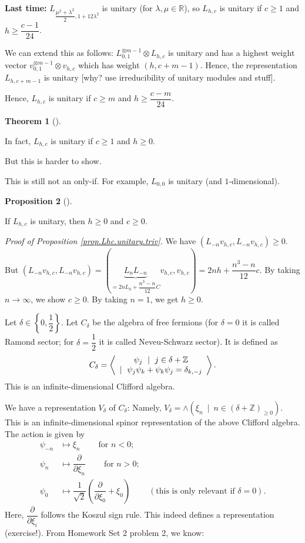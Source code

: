 \documentclass
[numbers=enddot,12pt,final,onecolumn,german,notitlepage]{scrartcl}%
\theoremstyle{definition}
\newtheorem{theo}{Theorem}
\newenvironment{theorem}[1][]
{\begin{theo}[#1]\begin{leftbar}}
{\end{leftbar}\end{theo}}
\newtheorem{prop}[theo]{Proposition}
\newenvironment{proposition}[1][]
{\begin{prop}[#1]\begin{leftbar}}
{\end{leftbar}\end{prop}}
\begin{document}
\textbf{Last time:} $L_{\dfrac{\mu^{2}+\lambda^{2}}{2},1+12\lambda^{2}}$ is
unitary (for $\lambda,\mu\in\mathbb{R}$), so $L_{h,c}$ is unitary if $c\geq1$
and $h\geq\dfrac{c-1}{24}$.

We can extend this as follows: $L_{0,1}^{\otimes m-1}\otimes L_{h,c}$ is
unitary and has a highest weight vector $v_{0,1}^{\otimes m-1}\otimes v_{h,c}$
which has weight $\left(  h,c+m-1\right)  $. Hence, the representation
$L_{h,c+m-1}$ is unitary [why? use irreducibility of unitary modules and stuff].

Hence, $L_{h,c}$ is unitary if $c\geq m$ and $h\geq\dfrac{c-m}{24}$.

\begin{theorem}
In fact, $L_{h,c}$ is unitary if $c\geq1$ and $h\geq0$.
\end{theorem}

But this is harder to show.

This is still not an only-if. For example, $L_{0,0}$ is unitary (and $1$-dimensional).

\begin{proposition}
\label{prop.Lhc.unitary.triv}If $L_{h,c}$ is unitary, then $h\geq0$ and
$c\geq0$.
\end{proposition}

\textit{Proof of Proposition \ref{prop.Lhc.unitary.triv}.} We have $\left(
L_{-n}v_{h,c},L_{-n}v_{h,c}\right)  \geq0$. But $\left(  L_{-n}v_{h,c}%
,L_{-n}v_{h,c}\right)  =\left(  \underbrace{L_{n}L_{-n}}_{=2nL_{0}%
+\dfrac{n^{3}-n}{12}C}v_{h,c},v_{h,c}\right)  =2nh+\dfrac{n^{3}-n}{12}c$. By
taking $n\rightarrow\infty$, we show $c\geq0$. By taking $n=1$, we get
$h\geq0$.

Let $\delta\in\left\{  0,\dfrac{1}{2}\right\}  $. Let $C_{\delta}$ be the
algebra of free fermions (for $\delta=0$ it is called Ramond sector; for
$\delta=\dfrac{1}{2}$ it is called Neveu-Schwarz sector). It is defined as%
\[
C_{\delta}=\left\langle
\begin{array}
[c]{c}%
\psi_{j}\ \mid\ j\in\delta+\mathbb{Z}\\
\mid\ \psi_{j}\psi_{k}+\psi_{k}\psi_{j}=\delta_{k,-j}%
\end{array}
\right\rangle .
\]
This is an infinite-dimensional Clifford algebra.

We have a representation $V_{\delta}$ of $C_{\delta}$: Namely, $V_{\delta
}=\wedge\left(  \xi_{n}\ \mid\ n\in\left(  \delta+\mathbb{Z}\right)  _{\geq
0}\right)  $. This is an infinite-dimensional spinor representation of the
above Clifford algebra. The action is given by%
\begin{align*}
\psi_{-n}  &  \mapsto\xi_{n}\ \ \ \ \ \ \ \ \ \ \text{for }n<0;\\
\psi_{n}  &  \mapsto\dfrac{\partial}{\partial\xi_{n}}%
\ \ \ \ \ \ \ \ \ \ \text{for }n>0;\\
\psi_{0}  &  \mapsto\dfrac{1}{\sqrt{2}}\left(  \dfrac{\partial}{\partial
\xi_{0}}+\xi_{0}\right)  \ \ \ \ \ \ \ \ \ \ \left(  \text{this is only
relevant if }\delta=0\right)  .
\end{align*}
Here, $\dfrac{\partial}{\partial\xi_{i}}$ follows the Koszul sign rule. This
indeed defines a representation (exercise!). From Homework Set 2 problem 2, we know:
\end{document}
